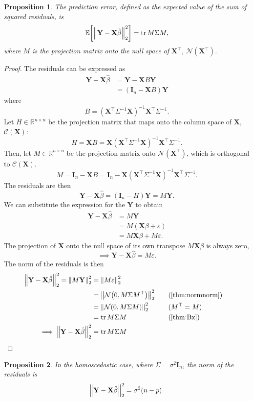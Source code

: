 \documentclass[letterpaper, reqno]{amsart}
\newtheorem{prop}{Proposition}[section]
\numberwithin{equation}{section}
\DeclarePairedDelimiter{\norm}{\lVert}{\rVert}
\newcommand{\T}{\top} %
\newcommand{\vect}[1]{\boldsymbol{\mathbf{#1}}} %
\newcommand{\E}[1]{\mathbb{E}\mleft[#1\mright]}
\newcommand{\R}{\mathbb{R}}  %
\newcommand{\N}[2]{\mathcal{N}\mleft( #1, #2 \mright)}
\newcommand{\by}[1]{&\quad&\text{(#1)}}
\newcommand{\Xm}{\vect{X}}
\newcommand{\Yv}{\vect{Y}}
\newcommand{\Bv}{\beta}
\newcommand{\Bvh}{\hat{\beta}}
\newcommand{\ve}{\varepsilon}
\DeclareMathOperator{\tr}{tr}
\begin{document}
\begin{prop} \label{prop:pred_err}
  The prediction error, defined as the expected value of the sum of squared
  residuals, is
  \[ \E{\norm*{\Yv - \Xm\Bvh}_2^2} = \tr M \Sigma M, \]
  where $M$ is the projection matrix onto the null space of $\Xm^\T$,
  $\mathscr{N}(\Xm^\T)$.
\end{prop}

\begin{proof}
  The residuals can be expressed as
  \begin{align*}
    \Yv - \Xm\Bvh &= \Yv - \Xm B \Yv \\
    &= (\vect{I}_n - \Xm B) \Yv
  \end{align*}
  where
  \[ B = (\Xm^\T \Sigma^{-1} \Xm)^{-1} \Xm^\T \Sigma^{-1}. \]
  Let $H \in \R^{n \times n}$ be the projection matrix that maps onto the column
  space of $\Xm$, $\mathscr{C}(\Xm)$:
  \[ H = \Xm B =  \Xm (\Xm^\T \Sigma^{-1} \Xm)^{-1} \Xm^\T \Sigma^{-1}. \]
  Then, let $M \in \R^{n \times n}$ be the projection matrix onto
  $\mathscr{N}(\Xm^\T)$, which is orthogonal to $\mathscr{C}(\Xm)$.
  \[ M = \vect{I}_n - \Xm B 
        = \vect{I}_n - \Xm (\Xm^\T \Sigma^{-1} \Xm)^{-1} \Xm^\T \Sigma^{-1}. \]
  The residuals are then
  \[ \Yv - \Xm\Bvh = (\vect{I}_n - H)\Yv = M\Yv. \]
  We can substitute the expression for the $\Yv$ to obtain
  \begin{align*}
    \Yv - \Xm\Bvh &= M \Yv \\
    &= M (\Xm\Bv + \ve) \\
    &= M\Xm\Bv + M\ve.
  \end{align*}
  The projection of $\Xm$ onto the null space of its own transpose $M\Xm\Bv$ is
  always zero,
  \[ \implies \Yv - \Xm\Bvh = M\ve. \]
  The norm of the residuals is then
  \begin{alignat*}{3}
    \norm*{\Yv - \Xm\Bvh}_2^2 = \norm*{M\Yv}_2^2 &= \norm*{M\ve}_2^2 \\
    &= \norm*{\N{0}{M\Sigma M^\T}}_2^2 \by{\Cref{thm:normnorm}} \\
    &= \norm*{\N{0}{M\Sigma M}}_2^2 \by{$M^\T = M$} \\
    &= \tr M\Sigma M \by{\Cref{thm:Bx}} \\
    \implies \norm*{\Yv - \Xm\Bvh}_2^2 &= \tr M\Sigma M \tag*{\qedhere}
  \end{alignat*}
\end{proof}

\begin{prop}
  In the homoscedastic case, where $\Sigma = \sigma^2 \vect{I}_n$, the norm of
  the residuals is  
  \[ \norm*{\Yv - \Xm\Bvh}_2^2 = \sigma^2 (n - p). \]
\end{prop}
\end{document}
